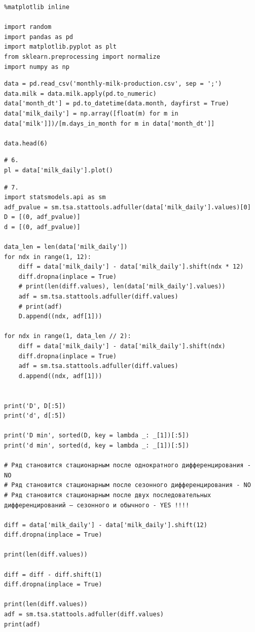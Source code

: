 \documentclass[11pt,a4paper]{article}
\begin{document}
\begin{verbatim}
%matplotlib inline

import random
import pandas as pd
import matplotlib.pyplot as plt
from sklearn.preprocessing import normalize
import numpy as np
\end{verbatim}

\begin{verbatim}
data = pd.read_csv('monthly-milk-production.csv', sep = ';')
data.milk = data.milk.apply(pd.to_numeric)
data['month_dt'] = pd.to_datetime(data.month, dayfirst = True)
data['milk_daily'] = np.array([float(m) for m in data['milk']])/[m.days_in_month for m in data['month_dt']]

data.head(6)
\end{verbatim}

\begin{verbatim}
# 6.
pl = data['milk_daily'].plot()
\end{verbatim}

\begin{verbatim}
# 7.
import statsmodels.api as sm
adf_pvalue = sm.tsa.stattools.adfuller(data['milk_daily'].values)[0]
D = [(0, adf_pvalue)]
d = [(0, adf_pvalue)]

data_len = len(data['milk_daily'])
for ndx in range(1, 12): 
    diff = data['milk_daily'] - data['milk_daily'].shift(ndx * 12)
    diff.dropna(inplace = True)
    # print(len(diff.values), len(data['milk_daily'].values))
    adf = sm.tsa.stattools.adfuller(diff.values)
    # print(adf)
    D.append((ndx, adf[1]))
    
for ndx in range(1, data_len // 2): 
    diff = data['milk_daily'] - data['milk_daily'].shift(ndx)
    diff.dropna(inplace = True)
    adf = sm.tsa.stattools.adfuller(diff.values)
    d.append((ndx, adf[1]))
    

print('D', D[:5])
print('d', d[:5])

print('D min', sorted(D, key = lambda _: _[1])[:5])
print('d min', sorted(d, key = lambda _: _[1])[:5])

# Ряд становится стационарным после однократного дифференцирования - NO
# Ряд становится стационарным после сезонного дифференцирования - NO
# Ряд становится стационарным после двух последовательных дифференцирований — сезонного и обычного - YES !!!!

diff = data['milk_daily'] - data['milk_daily'].shift(12)
diff.dropna(inplace = True)

print(len(diff.values))

diff = diff - diff.shift(1)
diff.dropna(inplace = True)

print(len(diff.values))
adf = sm.tsa.stattools.adfuller(diff.values)
print(adf)
\end{verbatim}
\end{document}
